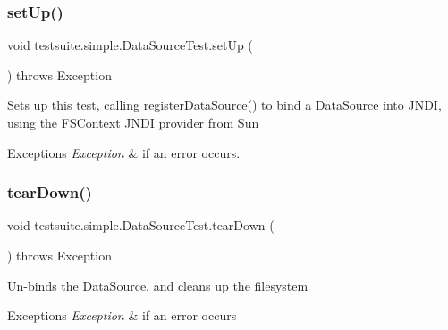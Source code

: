 \subsubsection{\texorpdfstring{set\+Up()}{setUp()}}
{\footnotesize\ttfamily void testsuite.\+simple.\+Data\+Source\+Test.\+set\+Up (\begin{DoxyParamCaption}{ }\end{DoxyParamCaption}) throws Exception}

Sets up this test, calling register\+Data\+Source() to bind a Data\+Source into J\+N\+DI, using the F\+S\+Context J\+N\+DI provider from Sun


\begin{DoxyExceptions}{Exceptions}
{\em Exception} & if an error occurs. \\
\hline
\end{DoxyExceptions}
\mbox{\label{classtestsuite_1_1simple_1_1_data_source_test_abed70f64e5fb149eef73ed2e7ccf3d59}} 
\subsubsection{\texorpdfstring{tear\+Down()}{tearDown()}}
{\footnotesize\ttfamily void testsuite.\+simple.\+Data\+Source\+Test.\+tear\+Down (\begin{DoxyParamCaption}{ }\end{DoxyParamCaption}) throws Exception}

Un-\/binds the Data\+Source, and cleans up the filesystem


\begin{DoxyExceptions}{Exceptions}
{\em Exception} & if an error occurs \\
\hline
\end{DoxyExceptions}
\mbox{\label{classtestsuite_1_1simple_1_1_data_source_test_a238136c42e16d78196d3a6104c43cce5}} 
